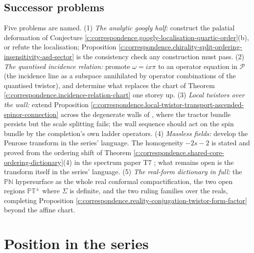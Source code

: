 \documentclass[11pt]{article}
\theoremstyle{definition}
\theoremstyle{plain}
\providecommand{\PT}{}\renewcommand{\PT}{\mathbb{PT}}
\begin{document}
\subsection*{Successor problems}
\label{c:note.correspondence.setting-successor-problems}
Five problems are named. (1) \emph{The analytic googly half:} construct the palatial deformation of Conjecture \ref{c:correspondence.googly-localisation-quartic-order}(b), or refute the localisation; Proposition \ref{c:correspondence.chirality-split-ordering-insensitivity-asd-sector} is the consistency check any construction must pass. (2) \emph{The quantised incidence relation:} promote $\omega = ix\pi$ to an operator equation in $\mathcal{P}$ (the incidence line as a subspace annihilated by operator combinations of the quantised twistor), and determine what replaces the chart of Theorem \ref{c:correspondence.incidence-relation-chart} one storey up. (3) \emph{Local twistors over the wall:} extend Proposition \ref{c:correspondence.local-twistor-transport-ascended-spinor-connection} across the degenerate walls of \cite{ButlerT4}, where the tractor bundle persists but the scale splitting fails; the wall sequence should act on the spin bundle by the completion's own ladder operators. (4) \emph{Massless fields:} develop the Penrose transform in the series' language. The homogeneity $-2s-2$ is stated and proved from the ordering shift of Theorem \ref{c:correspondence.shared-core-ordering-dictionary}(4) in the spectrum paper T7 \cite[Prop.~5.2]{ButlerT7}; what remains open is the transform itself in the series' language. (5) \emph{The real-form dictionary in full:} the $\mathbb{PN}$ hypersurface as the whole real conformal compactification, the two open regions $\PT^\pm$ where $\Sigma$ is definite, and the two ruling families over the reals, completing Proposition \ref{c:correspondence.reality-conjugation-twistor-form-factor} beyond the affine chart.

\section{Position in the series}
\end{document}
